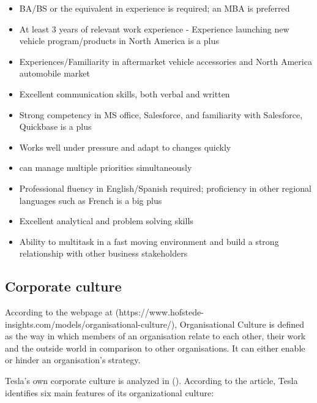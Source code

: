 \documentclass[12pt]{article}
\begin{document}
\begin{itemize}
	\item{BA/BS or the equivalent in experience is required; an MBA is preferred}
	\item{At least 3 years of relevant work experience - Experience launching new vehicle program/products in North America is a plus}
	\item{Experiences/Familiarity in aftermarket vehicle accessories and North America automobile market}
	\item{Excellent communication skills, both verbal and written}
	\item{Strong competency in MS office, Salesforce, and familiarity with Salesforce, Quickbase is a plus}
	\item{Works well under pressure and adapt to changes quickly}
	\item{can manage multiple priorities simultaneously}
	\item{Professional fluency in English/Spanish required; proficiency in other regional languages such as French is a big plus}
	\item{Excellent analytical and problem solving skills}
	\item{Ability to multitask in a fast moving environment and build a strong relationship with other business stakeholders}
\end{itemize}

\subsection{Corporate culture}

According to the webpage at (https://www.hofstede-insights.com/models/organisational-culture/), Organisational Culture is defined as the way in which members of an organisation relate to each other, their work and the outside world in comparison to other organisations. It can either enable or hinder an organisation's strategy.

Tesla's own corporate culture is analyzed in (\cite{me17}). According to the article, Tesla identifies six main features of its organizational culture:
\end{document}
